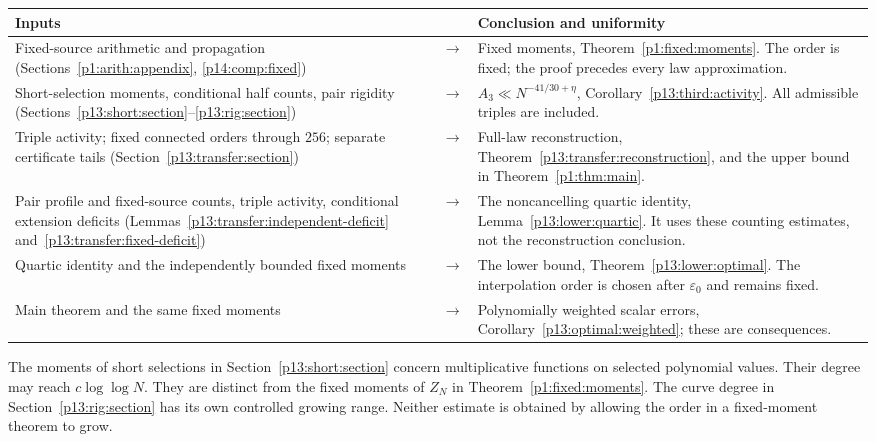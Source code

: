 \begin{center}
\small
\begin{tabularx}{\textwidth}{@{}>{\raggedright\arraybackslash}p{}>{\centering\arraybackslash}p{}>{\raggedright\arraybackslash}X@{}}
\toprule
Inputs & & Conclusion and uniformity\\
\midrule
Fixed-source arithmetic and propagation
(Sections~\ref{p1:arith:appendix}, \ref{p14:comp:fixed})
& \(\longrightarrow\)
& Fixed moments, Theorem~\ref{p1:fixed:moments}.
The order is fixed; the proof precedes every law approximation.\\[5pt]
Short-selection moments, conditional half counts, pair rigidity
(Sections~\ref{p13:short:section}--\ref{p13:rig:section})
& \(\longrightarrow\)
& \(A_3\ll N^{-41/30+\eta}\),
Corollary~\ref{p13:third:activity}.
All admissible triples are included.\\[5pt]
Triple activity; fixed connected orders through \(256\);
separate certificate tails
(Section~\ref{p13:transfer:section})
& \(\longrightarrow\)
& Full-law reconstruction,
Theorem~\ref{p13:transfer:reconstruction}, and the upper bound
in Theorem~\ref{p1:thm:main}.\\[5pt]
Pair profile and fixed-source counts, triple activity,
conditional extension deficits
(Lemmas~\ref{p13:transfer:independent-deficit}
and~\ref{p13:transfer:fixed-deficit})
& \(\longrightarrow\)
& The noncancelling quartic identity,
Lemma~\ref{p13:lower:quartic}.
It uses these counting estimates, not the reconstruction conclusion.\\[5pt]
Quartic identity and the independently bounded fixed moments
& \(\longrightarrow\)
& The lower bound, Theorem~\ref{p13:lower:optimal}.
The interpolation order is chosen after \(\varepsilon_0\)
and remains fixed.\\[5pt]
Main theorem and the same fixed moments
& \(\longrightarrow\)
& Polynomially weighted scalar errors,
Corollary~\ref{p13:optimal:weighted}; these are consequences.\\
\bottomrule
\end{tabularx}
\end{center}

The moments of short selections in Section~\ref{p13:short:section}
concern multiplicative functions on selected polynomial values.
Their degree may reach \(c\log\log N\). They are distinct from the
fixed moments of \(Z_N\) in Theorem~\ref{p1:fixed:moments}.
The curve degree in Section~\ref{p13:rig:section} has its own
controlled growing range. Neither estimate is obtained by allowing
the order in a fixed-moment theorem to grow.

